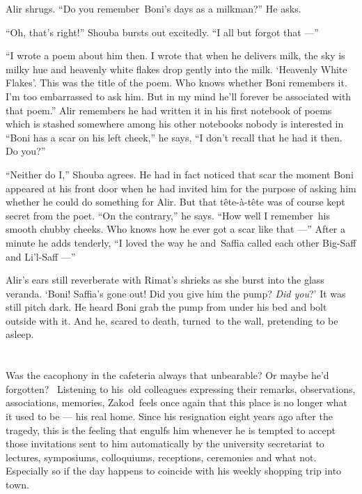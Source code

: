 \documentclass[twoside,11pt]{book}
\begin{document}
Alir shrugs. ``Do you remember~Boni's days as a milkman?'' He asks.

``Oh, that's right!'' Shouba bursts out excitedly. ``I all but forgot that ---''

``I wrote a poem about him then. I wrote that when he delivers milk, the sky is milky hue and heavenly
white flakes drop gently into the milk. `Heavenly White Flakes'. This was the title of the poem. Who knows whether Boni
remembers it. I'm too embarrassed to ask him. But in my mind he'll forever be associated with that poem.''
Alir remembers he had written it in his first notebook of poems which is stashed somewhere among his other notebooks
nobody is interested in ``Boni has a scar on his left cheek,'' he says, ``I
don't recall that he had it then. Do you?''

``Neither do I,'' Shouba agrees.  He had in fact noticed that scar the moment Boni appeared
at his front door when he had invited him for the purpose of asking him whether he could do something for Alir. But
that t\^ete-\`a-t\^ete was of course kept secret from the poet. ``On the contrary,'' he says.
``How well I remember~his smooth chubby cheeks. Who knows how he ever got a scar like
that ---'' After a minute he adds tenderly, ``I loved the way he and~Saffia called each other
Big-Saff and Li'l-Saff ---''

Alir's ears still reverberate with Rimat's shrieks as she burst into the glass veranda.  `Boni! Saffia's gone
out! Did you give him the pump? \textit{Did you}?' It was still pitch dark. He heard Boni grab the pump from under his
bed and bolt outside with it. And he, scared to death, turned~to the wall, pretending to be asleep.



\chapter{}

Was the cacophony in the cafeteria always that unbearable? Or maybe he'd forgotten? ~Listening to his~old colleagues
expressing their remarks, observations, associations, memories, Zakod~feels once again that this place is no longer
what it used to be --- his real home. Since his resignation eight years ago after the tragedy, this is the feeling that
engulfs him whenever he is tempted to accept those invitations sent to him automatically by the university secretariat
to lectures, symposiums, colloquiums, receptions, ceremonies and what not. Especially so if the day happens
to coincide with his weekly shopping trip into town.
\end{document}
